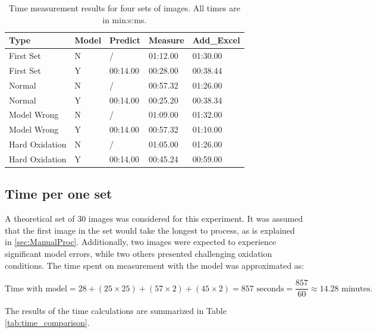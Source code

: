 \begin{table}[H]
    \centering
    \caption{Time measurement results for four sets of images. All times are in min:s:ms.}

    \begin{tabular}{lllll}
        \toprule
        \textbf{Type} & \textbf{Model} & \textbf{Predict} & \textbf{Measure} & \textbf{Add\_Excel} \\
        \midrule
        First Set    & N & /         & 01:12.00 & 01:30.00 \\
        First Set    & Y & 00:14.00  & 00:28.00 & 00:38.44 \\
        Normal         & N & /         & 00:57.32 & 01:26.00 \\
        Normal         & Y & 00:14.00  & 00:25.20 & 00:38.34 \\
        Model Wrong    & N & /         & 01:09.00 & 01:32.00 \\
        Model Wrong    & Y & 00:14.00  & 00:57.32 & 01:10.00 \\
        Hard Oxidation & N & /         & 01:05.00 & 01:26.00 \\
        Hard Oxidation & Y & 00:14.00  & 00:45.24 & 00:59.00 \\
        \bottomrule
    \end{tabular}
    \label{tab:time-measurements}
\end{table}



\subsection{Time per one set}

A theoretical set of 30 images was considered for this experiment. It was assumed that the first image in the set would take the longest to process, as is explained in \ref{sec:ManualProc}. Additionally, two images were expected to experience significant model errors, while two others presented challenging oxidation conditions. The time spent on measurement with the model was approximated as:

\[
\text{Time with model} = 28 + (25 \times 25) + (57 \times 2) + (45 \times 2) = 857 \text{ seconds} = \frac{857}{60} \approx 14.28 \text{ minutes}.
\]

The results of the time calculations are summarized in Table \ref{tab:time_comparison}.


